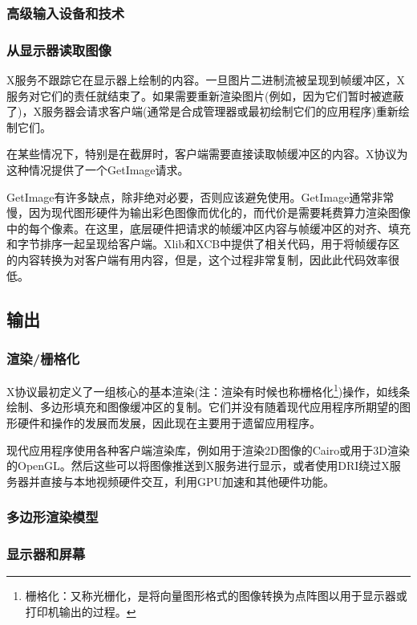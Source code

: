 \subsubsection{高级输入设备和技术}


\subsubsection{从显示器读取图像}

X服务不跟踪它在显示器上绘制的内容。一旦图片二进制流被呈现到帧缓冲区，X服务对它们的责任就结束了。如果需要重新渲染图片(例如，因为它们暂时被遮蔽了)，X服务器会请求客户端(通常是合成管理器或最初绘制它们的应用程序)重新绘制它们。

在某些情况下，特别是在截屏时，客户端需要直接读取帧缓冲区的内容。X协议为这种情况提供了一个GetImage请求。

GetImage有许多缺点，除非绝对必要，否则应该避免使用。GetImage通常非常慢，因为现代图形硬件为输出彩色图像而优化的，而代价是需要耗费算力渲染图像中的每个像素。在这里，底层硬件把请求的帧缓冲区内容与帧缓冲区的对齐、填充和字节排序一起呈现给客户端。Xlib和XCB中提供了相关代码，用于将帧缓存区的内容转换为对客户端有用内容，但是，这个过程非常复制，因此此代码效率很低。

\subsection{输出}

\subsubsection{渲染/栅格化}

X协议最初定义了一组核心的基本渲染(注：渲染有时候也称栅格化\footnote{栅格化：又称光栅化，是将向量图形格式的图像转换为点阵图以用于显示器或打印机输出的过程。})操作，如线条绘制、多边形填充和图像缓冲区的复制。它们并没有随着现代应用程序所期望的图形硬件和操作的发展而发展，因此现在主要用于遗留应用程序。

现代应用程序使用各种客户端渲染库，例如用于渲染2D图像的Cairo或用于3D渲染的OpenGL。然后这些可以将图像推送到X服务进行显示，或者使用DRI绕过X服务器并直接与本地视频硬件交互，利用GPU加速和其他硬件功能。


\subsubsection{多边形渲染模型}


\subsubsection{显示器和屏幕}

